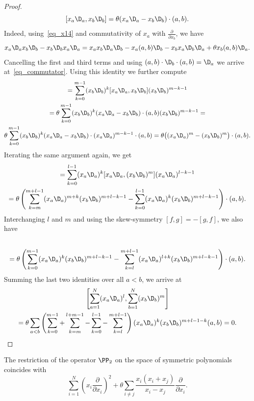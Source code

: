 \begin{proof}
\begin{equation}
 \label{eq_commutator}
  [x_a \D_a, x_b \D_b]=  \theta (x_a \D_a - x_b \D_b) \cdot (a,b).
\end{equation}
Indeed, using~\eqref{eq_x14} and commutativity of $x_a$ with $\frac{\partial}{\partial x_b}$, we have
$$
 x_a \D_a x_b \D_b - x_b \D_b x_a \D_a= x_a x_b \D_a \D_b - x_a (a,b) \D_b - x_b x_a \D_b \D_a +\theta x_b (a,b) \D_a.
$$
Cancelling the first and third terms and using $(a,b) \cdot  \D_b \cdot (a,b)=\D_a$ we arrive at~\eqref{eq_commutator}. Using this identity we further compute
\begin{multline}
[x_a \D_a, (x_b \D_b)^m]=\sum_{k=0}^{m-1} (x_b \D_b)^k [x_a \D_a,x_b \D_b] (x_b\D_b)^{m-k-1}\\=\theta \sum_{k=0}^{m-1} (x_b \D_b)^k (x_a \D_a - x_b \D_b) \cdot (a,b) (x_b\D_b)^{m-k-1}= \\ \theta \sum_{k=0}^{m-1} (x_b \D_b)^k (x_a \D_a - x_b \D_b) \cdot (x_a\D_a)^{m-k-1} \cdot  (a,b)=
\theta \bigl((x_a \D_a)^m - (x_b \D_b)^m\bigr) \cdot (a,b).
\end{multline}
Iterating the same argument again, we get
\begin{multline*}
[(x_a \D_a)^l, (x_b \D_b)^m]=\sum_{k=0}^{l-1} (x_a \D_a)^k [x_a \D_a,(x_b \D_b)^m] (x_a\D_a)^{l-k-1}\\
=\theta  \left(  \sum_{k=m}^{m+l-1} (x_a \D_a)^{m+k} (x_b\D_b)^{m+l-k-1}  - \sum_{k=0}^{l-1} (x_a \D_a)^k (x_b \D_b)^{m+l-k-1}\right)  \cdot (a,b).
\end{multline*}
Interchanging $l$ and $m$ and using the skew-symmetry $[f,g]=-[g,f]$, we also have
\begin{multline*}
[(x_b \D_b)^l, (x_a \D_a)^m]\\ =\theta  \left( \sum_{k=0}^{m-1} (x_a \D_a)^k (x_b \D_b)^{m+l-k-1}- \sum_{k=l}^{m+l-1} (x_a \D_a)^{l+k} (x_b\D_b)^{m+l-k-1}\right)  \cdot (a,b).
\end{multline*}
Summing the last two identities over all $a<b$, we arrive at
\begin{multline}
 \left[\sum_{a=1}^N(x_a \D_a)^l, \sum_{b=1}^N(x_b \D_b)^m\right]\\ =\theta \sum_{a<b} \left(\sum_{k=0}^{m-1} + \sum_{k=m}^{l+m-1} -\sum_{k=0}^{l-1} -\sum_{k=l}^{m+l-1} \right) (x_a \D_a)^k (x_b \D_b)^{m+l-1-k} (a,b)=0.
\end{multline}
\end{proof}
\begin{lemma}\label{Lemma_CMS}
 The restriction of the operator $\PP_2$ on the space of symmetric polynomials coincides with
 \begin{equation} \label{eq_CMS}
   \sum_{i=1}^N \left(x_i \frac{\partial}{\partial x_i}\right)^2 + \theta \sum_{i\ne j} \frac{ x_i(x_i+x_j)}{x_i-x_j} \frac{\partial}{\partial x_i}.
 \end{equation}
\end{lemma}

